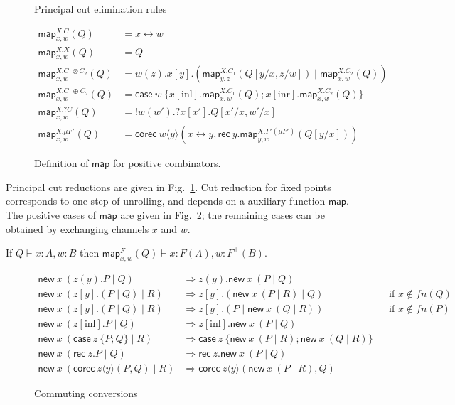 \documentclass[orivec,envcountsame]{llncs}
\newcommand{\cpdual}[1]{#1^\perp}
\newcommand{\cpquery}[1]{{? #1}}
\newcommand{\cptyp}[2]{#1 \vdash #2}
\newcommand{\mapname}{\mathsf{map}}
\newcommand{\map}[3]{\mapname^{#1}_{#2}(#3)}
\newcommand{\mkwd}[1]{\mathsf{#1}}
\newcommand{\link}[2]{#1 \leftrightarrow #2}
\newcommand{\cut}[4]{\mkwd{new}\:#1 \: (#3 \mid #4)}
\newcommand{\replicate}[2]{{!#1(#2)}}
\newcommand{\derelict}[2]{{?#1[#2]}}
\newcommand{\rec}[1]{\mkwd{rec}\:#1}
\newcommand{\corec}[5]{\mkwd{corec}\:#1 \langle #2 \rangle (#4,#5)}
\newcommand{\clabel}[1]{\mathrm{#1}}
\renewcommand{\case}[2]{\mkwd{case}\:#1\:\{#2\}}
\newcommand{\sel}[2]{#1[\clabel{#2}]}
\begin{document}
\begin{figure}
\caption{Principal cut elimination rules}\label{fig:beta-reduction}
\end{figure}

\begin{figure}\small
\begin{align*}
  \map{X.C}{x,w}{Q} &= \link{x}{w} \\
  \map{X.X}{x,w}{Q} &= Q \\
  \map{X.C_1 \otimes C_2}{x,w}{Q} &= w(z).x[y].(\map{X.C_1}{y,z}{Q[y/x,z/w]} \mid \map{X.C_2}{x,w}{Q}) \\
  \map{X.C_1 \oplus C_2}{x,w}{Q} &= \case{w}{\sel{x}{inl}.\map{X.C_1}{x,w}{Q}; \sel{x}{inr}.\map{X.C_2}{x,w}{Q}} \\
  \map{X.\cpquery{C}}{x,w}{Q} &= \replicate{w}{w'}.\derelict{x}{x'}.Q[x'/x,w'/x] \\
  \map{X.\mu F'}{x,w}{Q} &= \corec{w}{y}{\nu(\cpdual{C}(A))}{\link{x}{y}}{\rec{y}.\map{X.F' (\mu F')}{y,w}{Q[y/x]}}
\end{align*}
\caption{Definition of $\mapname$ for positive combinators.}\label{fig:map}
\end{figure}

Principal cut reductions are given in Fig.~\ref{fig:beta-reduction}. Cut reduction for fixed points
corresponds to one step of unrolling, and depends on a auxiliary function $\mapname$. The positive
cases of $\mapname$ are given in Fig.~\ref{fig:map}; the remaining cases can be obtained by
exchanging channels $x$ and $w$.

\begin{lemma}
  If $\cptyp{Q}{x:A,w:B}$ then \(\cptyp{\map{F}{x,w}{Q}}{x:F(A), w:\cpdual{F}(B)}.\)
\end{lemma}

\begin{figure}\small
\begin{align*}
  \cut{x}{A}{z(y).P}{Q} &\Longrightarrow z(y).\cut{x}{A}{P}{Q} \\
  \cut{x}{A}{z[y].(P \mid Q)}{R} &\Longrightarrow z[y].(\cut{x}{A}{P}{R} \mid Q) &&\text{if $x \not\in fn(Q)$} \\
  \cut{x}{A}{z[y].(P \mid Q)}{R} &\Longrightarrow z[y].(P \mid \cut{x}{A}{Q}{R}) &&\text{if $x \not\in fn(P)$} \\
  \cut{x}{A}{\sel{z}{inl}.P}{Q} &\Longrightarrow \sel{z}{inl}.\cut{x}{A}{P}{Q} \\
  \cut{x}{A}{\case{z}{P;Q}}{R} &\Longrightarrow \case{z}{\cut{x}{A}{P}{R}; \cut{x}{A}{Q}{R}} \\
  \cut{x}{A}{\rec{z}.P}{Q} &\Longrightarrow \rec{z}.\cut{x}{A}{P}{Q} \\
  \cut{x}{A}{\corec{z}{y}{B}{P}{Q}}{R} &\Longrightarrow \corec{z}{y}{B}{\cut{x}{A}{P}{R}}{Q}
\end{align*}
\caption{Commuting conversions}\label{fig:commuting}
\end{figure}
\end{document}
